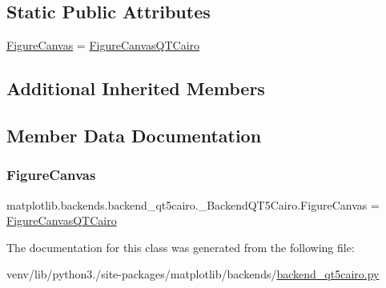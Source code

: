 \subsection*{Static Public Attributes}
\begin{DoxyCompactItemize}
\item 
\hyperlink{classmatplotlib_1_1backends_1_1backend__qt5cairo_1_1__BackendQT5Cairo_a5602a21d6d43c98191f5ee12ce2065f6}{Figure\+Canvas} = \hyperlink{classmatplotlib_1_1backends_1_1backend__qt5cairo_1_1FigureCanvasQTCairo}{Figure\+Canvas\+Q\+T\+Cairo}
\end{DoxyCompactItemize}
\subsection*{Additional Inherited Members}


\subsection{Member Data Documentation}
\mbox{\label{classmatplotlib_1_1backends_1_1backend__qt5cairo_1_1__BackendQT5Cairo_a5602a21d6d43c98191f5ee12ce2065f6}} 
\subsubsection{\texorpdfstring{Figure\+Canvas}{FigureCanvas}}
{\footnotesize\ttfamily matplotlib.\+backends.\+backend\+\_\+qt5cairo.\+\_\+\+Backend\+Q\+T5\+Cairo.\+Figure\+Canvas = \hyperlink{classmatplotlib_1_1backends_1_1backend__qt5cairo_1_1FigureCanvasQTCairo}{Figure\+Canvas\+Q\+T\+Cairo}\hspace{0.3cm}{\ttfamily [static]}}



The documentation for this class was generated from the following file\+:\begin{DoxyCompactItemize}
\item 
venv/lib/python3./site-\/packages/matplotlib/backends/\hyperlink{backend__qt5cairo_8py}{backend\+\_\+qt5cairo.\+py}\end{DoxyCompactItemize}
